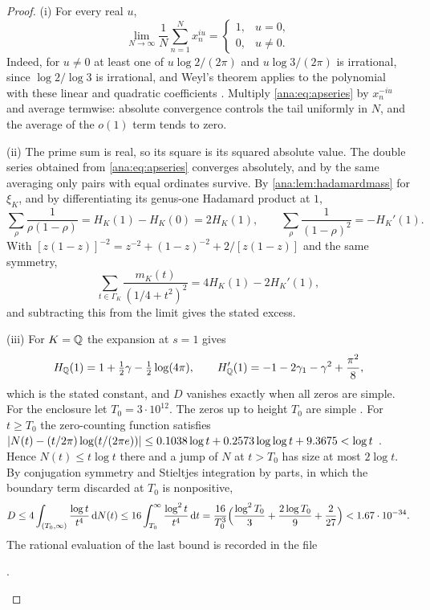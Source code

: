 \begin{proof}
(i) For every real $u$,
\[
 \lim_{N\to\infty}\frac1N\sum_{n=1}^Nx_n^{iu}=\begin{cases}1,&u=0,\\0,&u\ne0.\end{cases}
\]
Indeed, for $u\ne0$ at least one of $u\log2/(2\pi)$ and $u\log3/(2\pi)$ is irrational, since
$\log2/\log3$ is irrational, and Weyl's theorem applies to the polynomial with these linear
and quadratic coefficients \cite{Weyl1916Gleichverteilung}. Multiply \eqref{ana:eq:apseries}
by $x_n^{-iu}$ and average termwise: absolute convergence controls the tail uniformly in $N$,
and the average of the $o(1)$ term tends to zero.

(ii) The prime sum is real, so its square is its squared absolute value. The double series
obtained from \eqref{ana:eq:apseries} converges absolutely, and by the same averaging only
pairs with equal ordinates survive. By \cref{ana:lem:hadamardmass} for $\xi_K$, and by
differentiating its genus-one Hadamard product at $1$,
\[
 \sum_\rho\frac1{\rho(1-\rho)}=H_K(1)-H_K(0)=2H_K(1),\qquad
 \sum_\rho\frac1{(1-\rho)^2}=-H_K'(1).
\]
With $[z(1-z)]^{-2}=z^{-2}+(1-z)^{-2}+2/[z(1-z)]$ and the same symmetry,
\[
 \sum_{t\in\Gamma_K}\frac{m_K(t)}{(1/4+t^2)^2}=4H_K(1)-2H_K'(1),
\]
and subtracting this from the limit gives the stated excess.

(iii) For $K=\mathbb{Q}$ the expansion at $s=1$ gives
\[
 H_{\mathbb{Q}}(1)=1+\tfrac12\gamma-\tfrac12\log(4\pi),\qquad
 H_{\mathbb{Q}}'(1)=-1-2\gamma_1-\gamma^2+\frac{\pi^2}8,
\]
which is the stated constant, and $D$ vanishes exactly when all zeros are simple. For the
enclosure let $T_0=3\cdot10^{12}$. The zeros up to height $T_0$ are simple
\cite{PlattTrudgian2021Riemann}. For $t\ge T_0$ the zero-counting function satisfies
$\lvert N(t)-(t/2\pi)\log(t/(2\pi e))\rvert\le0.1038\log t+0.2573\log\log t+9.3675<\log t$
\cite[Corollary~1.2]{HasanalizadeShenWong2021Counting}. Hence $N(t)\le t\log t$ there and a
jump of $N$ at $t>T_0$ has size at most $2\log t$. By conjugation symmetry and Stieltjes
integration by parts, in which the boundary term discarded at $T_0$ is nonpositive,
\[
 D\le4\int_{(T_0,\infty)}\frac{\log t}{t^4}\,\mathrm{d} N(t)
 \le16\int_{T_0}^\infty\frac{\log^2t}{t^4}\,\mathrm{d} t
 =\frac{16}{T_0^3}\Bigl(\frac{\log^2T_0}3+\frac{2\log T_0}9+\frac2{27}\Bigr)<1.67\cdot10^{-34}.
\]
The rational evaluation of the last bound is recorded in the file
\begin{center}
.
\end{center}
\end{proof}

